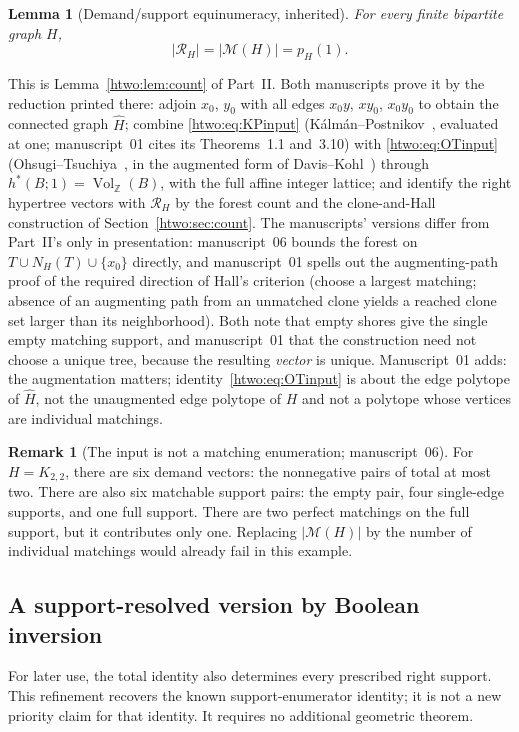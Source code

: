 \documentclass[11pt]{article}
\numberwithin{equation}{section}
\newtheorem{lemma}[theorem]{Lemma}
\theoremstyle{definition}
\newtheorem{remark}[theorem]{Remark}
\newcommand{\Z}{\mathbb Z}
\newcommand{\Vol}{\operatorname{Vol}_{\Z}}
\begin{document}
\begin{lemma}[Demand/support equinumeracy, inherited]\label{gam:lem:count}
For every finite bipartite graph $H$,
\begin{equation}
 |\mathcal R_H|=|\mathcal M(H)|=p_H(1).
 \label{gam:eq:count}
\end{equation}
\end{lemma}
This is Lemma~\ref{htwo:lem:count} of Part~II. Both manuscripts prove it by
the reduction printed there: adjoin $x_0$, $y_0$ with all edges $x_0y$,
$xy_0$, $x_0y_0$ to obtain the connected graph $\widehat H$; combine
\eqref{htwo:eq:KPinput} (K\'alm\'an--Postnikov~\cite{KP}, evaluated at one;
manuscript~01 cites its Theorems~1.1 and~3.10) with \eqref{htwo:eq:OTinput}
(Ohsugi--Tsuchiya~\cite[Propositions~3.3--3.4]{OT20}, in the augmented form
of Davis--Kohl~\cite[Theorem~3.10]{DK}) through $h^*(B;1)=\Vol(B)$, with the
full affine integer lattice; and identify the right hypertree vectors with
$\mathcal R_H$ by the forest count and the clone-and-Hall construction of
Section~\ref{htwo:sec:count}. The manuscripts' versions differ from Part~II's
only in presentation: manuscript~06 bounds the forest on
$T\cup N_H(T)\cup\{x_0\}$ directly, and manuscript~01 spells out the
augmenting-path proof of the required direction of Hall's criterion (choose
a largest matching; absence of an augmenting path from an unmatched clone
yields a reached clone set larger than its neighborhood). Both note that
empty shores give the single empty matching support, and manuscript~01 that
the construction need not choose a unique tree, because the resulting
\emph{vector} is unique. Manuscript~01 adds: the augmentation matters;
identity~\eqref{htwo:eq:OTinput} is about the edge polytope of $\widehat H$,
not the unaugmented edge polytope of $H$ and not a polytope whose vertices
are individual matchings.

\begin{remark}[The input is not a matching enumeration; manuscript~06]\label{gam:rem:K22}
For $H=K_{2,2}$, there are six demand vectors: the nonnegative pairs of total
at most two. There are also six matchable support pairs: the empty pair,
four single-edge supports, and one full support. There are two perfect
matchings on the full support, but it contributes only one. Replacing
$|\mathcal M(H)|$ by the number of individual matchings would already fail
in this example.
\end{remark}

\subsection{A support-resolved version by Boolean inversion}
For later use, the total identity also determines every prescribed right
support. This refinement recovers the known support-enumerator identity;
it is not a new priority claim for that identity. It requires no additional
geometric theorem.
\end{document}
